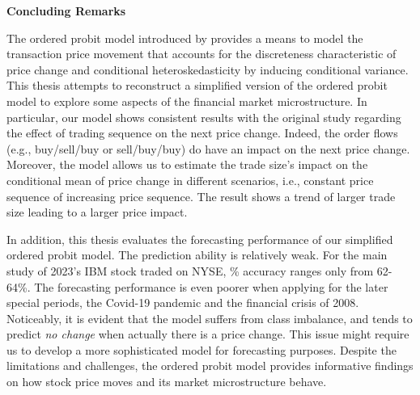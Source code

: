 {\noindent\bfseries Concluding Remarks }

The ordered probit model introduced by \citet{hausman1992} provides a means to model the transaction price movement that accounts for the discreteness characteristic of price change and conditional heteroskedasticity by inducing conditional variance. This thesis attempts to reconstruct a simplified version of the ordered probit model to explore some aspects of the financial market microstructure. In particular, our model shows consistent results with the original study regarding the effect of trading sequence on the next price change. Indeed, the order flows (e.g., buy/sell/buy or sell/buy/buy) do have an impact on the next price change. Moreover, the model allows us to estimate the trade size's impact on the conditional mean of price change in different scenarios, i.e., constant price sequence of increasing price sequence. The result shows a trend of larger trade size leading to a larger price impact.

In addition, this thesis evaluates the forecasting performance of our simplified ordered probit model. The prediction ability is relatively weak. For the main study of 2023's IBM stock traded on NYSE, \% accuracy ranges only from 62-64\%. The forecasting performance is even poorer when applying for the later special periods, the Covid-19 pandemic and the financial crisis of 2008. Noticeably, it is evident that the model suffers from class imbalance, and tends to predict \textit{no change} when actually there is a price change. This issue might require us to develop a more sophisticated model for forecasting purposes. Despite the limitations and challenges, the ordered probit model provides informative findings on how stock price moves and its market microstructure behave.